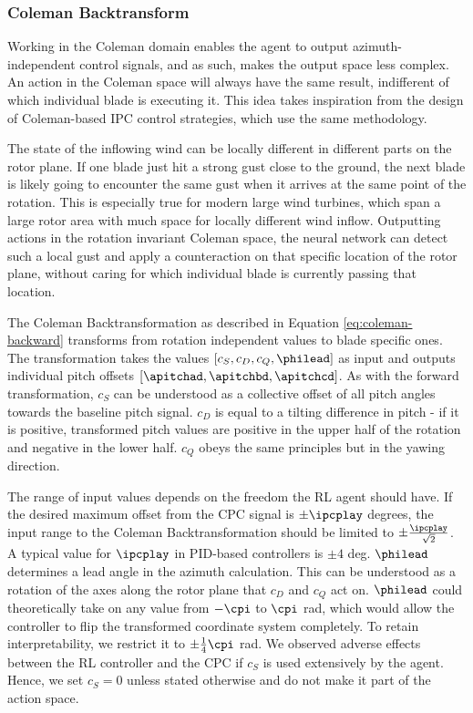 \subsubsection{Coleman Backtransform}

Working in the Coleman domain enables the agent to output azimuth-independent control signals, and as such, makes the output space less complex. An action in the Coleman space will always have the same result, indifferent of which individual blade is executing it. This idea takes inspiration from the design of Coleman-based IPC control strategies, which use the same methodology.

The state of the inflowing wind can be locally different in different parts on the rotor plane. If one blade just hit a strong gust close to the ground, the next blade is likely going to encounter the same gust when it arrives at the same point of the rotation. This is especially true for modern large wind turbines, which span a large rotor area with much space for locally different wind inflow. Outputting actions in the rotation invariant Coleman space, the neural network can detect such a local gust and apply a counteraction on that specific location of the rotor plane, without caring for which individual blade is currently passing that location. 

The Coleman Backtransformation as described in Equation \ref{eq:coleman-backward} transforms from rotation independent values to blade specific ones. The transformation takes the values $[c_S, c_D, c_Q, \philead]$ as input and outputs individual pitch offsets $[\apitchad, \apitchbd, \apitchcd]$. As with the forward transformation, $c_S$ can be understood as a collective offset of all pitch angles towards the baseline pitch signal. $c_D$ is equal to a tilting difference in pitch - if it is positive, transformed pitch values are positive in the upper half of the rotation and negative in the lower half. $c_Q$ obeys the same principles but in the yawing direction. 

The range of input values depends on the freedom the RL agent should have. If the desired maximum offset from the \ac{CPC} signal is $\pm \ipcplay$ degrees, the input range to the Coleman Backtransformation should be limited to $\pm \frac{\ipcplay}{\sqrt{2}}$. A typical value for $\ipcplay$ in PID-based controllers is $\pm4$ deg. $\philead$ determines a lead angle in the azimuth calculation. This can be understood as a rotation of the axes along the rotor plane that $c_D$ and $c_Q$ act on. $\philead$ could theoretically take on any value from $-\cpi$ to $\cpi$ rad, which would allow the controller to flip the transformed coordinate system completely. To retain interpretability, we restrict it to $\pm\frac{1}{4}\cpi$ rad. We observed adverse effects between the \ac{RL} controller and the \ac{CPC} if $c_S$ is used extensively by the agent. Hence, we set $c_S=0$ unless stated otherwise and do not make it part of the action space.

